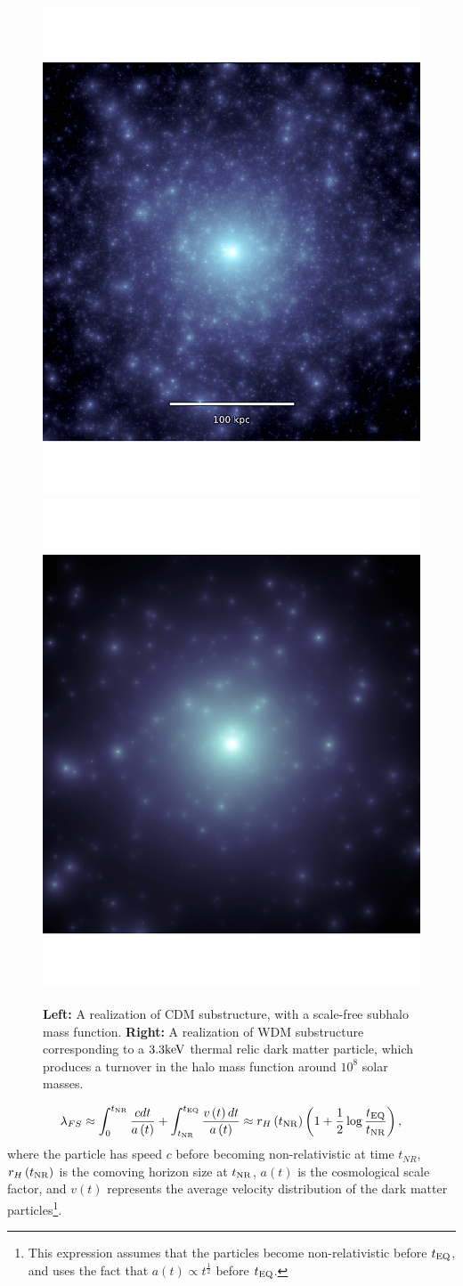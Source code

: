 \begin{figure}
	\centering
	\includegraphics[clip,trim=0cm 0cm 0cm
	0cm,width=.49\textwidth,keepaspectratio]{./figures_introduction/CDMscreenshot_edited.pdf}
	\includegraphics[clip,trim=0cm 0cm 0cm
	0cm,width=.49\textwidth,keepaspectratio]{./figures_introduction/WDMrealization_nobar.pdf}
	\caption[CDM and WDM subhalo populations]{\label{fig:wdmrealization} {\bf{Left:}} A realization of CDM substructure, with a scale-free subhalo mass function. {\bf{Right:}} A realization of WDM substructure corresponding to a $3.3 \rm{keV}$ thermal relic dark matter particle, which produces a turnover in the halo mass function around $10^8$ solar masses. }
\end{figure}

\begin{equation}
\label{eqn:freestreaming}
\lambda_{FS} \approx \int_{0}^{t_{\rm{NR}}} \frac{c dt}{a\left(t\right)} +  \int_{t_{\rm{NR}}}^{t_{\rm{EQ}}} \frac{v\left(t\right) dt}{a\left(t\right)} \approx r_{H}\left(t_{\rm{NR}}\right) \left(1 +\frac{1}{2} \log \frac{t_{\rm{EQ}}}{t_{\rm{NR}}} \right),
\end{equation}
where the particle has speed $c$ before becoming non-relativistic at time $t_{NR}$, $r_H \left(t_{\rm{NR}}\right)$ is the comoving horizon size at $t_{\rm{NR}}$, $a\left(t\right)$ is the cosmological scale factor, and $v\left(t\right)$ represents the average velocity distribution of the dark matter particles\footnote{This expression assumes that the particles become non-relativistic before $t_{\rm{EQ}}$, and uses the fact that $a\left(t\right)\propto t^{\frac{1}{2}}$ before $t_{\rm{EQ}}$.}. 

